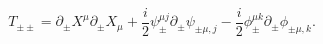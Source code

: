 \begin{equation}
T_{\pm\pm}=
\partial_{\pm}X^{\mu}\partial_{\pm}X_{\mu}+\frac{i}{ 2}{\psi}^{\mu j}_{\pm}\partial_{\pm}
 \psi_{\pm\mu,j }- \frac{i}{2}{\phi}_{\pm}^{\mu k}\partial_{\pm}\phi_{\pm\mu,k}.
\end{equation}

